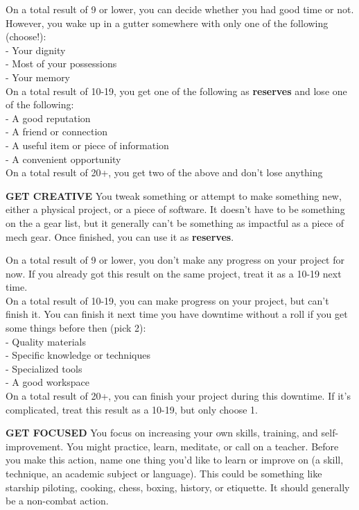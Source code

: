 On a total result of 9 or lower, you can decide whether you had good time or not. However, you wake up in a gutter somewhere with only one of the following (choose!):\\
-    Your dignity\\
-    Most of your possessions\\
-    Your memory\\
On a total result of 10-19, you get one of the following as \textbf{reserves} and lose one of the following:\\
-    A good reputation\\
-    A friend or connection\\
-    A useful item or piece of information\\
-    A convenient opportunity\\
On a total result of 20+, you get two of the above and don’t lose anything

\textbf{GET CREATIVE}
You tweak something or attempt to make something new, either a physical project, or a piece of software. It doesn’t have to be something on the a gear list, but it generally can’t be something as impactful as a piece of mech gear. Once finished, you can use it as \textbf{reserves}. 

On a total result of 9 or lower, you don’t make any progress on your project for now. If you already got this result on the same project, treat it as a 10-19 next time.\\
On a total result of 10-19, you can make progress on your project, but can’t finish it. You can finish it next time you have downtime without a roll if you get some things before then (pick 2):\\
-    Quality materials\\
-    Specific knowledge or techniques\\
-    Specialized tools\\
-    A good workspace\\
On a total result of 20+, you can finish your project during this downtime. If it’s complicated, treat this result as a 10-19, but only choose 1.

\textbf{GET FOCUSED}
You focus on increasing your own skills, training, and self-improvement. You might practice, learn, meditate, or call on a teacher. Before you make this action, name one thing you’d like to learn or improve on (a skill, technique, an academic subject or language). This could be something like starship piloting, cooking, chess, boxing, history, or etiquette. It should generally be a non-combat action.


